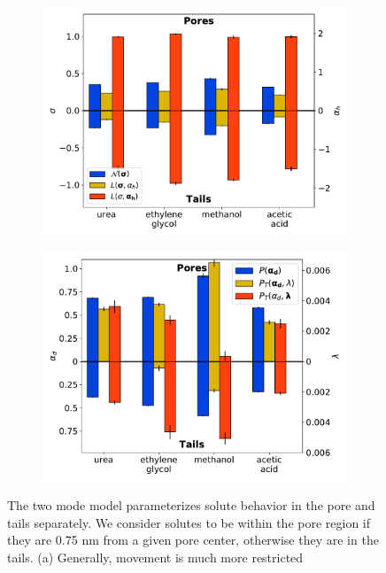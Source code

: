 \documentclass{article}
\begin{document}
  \begin{figure}
  \centering
  \begin{subfigure}{0.475\textwidth}
  \includegraphics[width=\textwidth]{2mode_AD_hops.pdf}
  \caption{}\label{fig:2mode_AD_hops}
  \end{subfigure}
  \begin{subfigure}{0.475\textwidth}
  \includegraphics[width=\textwidth]{2mode_AD_dwells.pdf}
  \caption{}\label{fig:2mode_AD_dwells}
  \end{subfigure}
  \caption{
  The two mode model parameterizes solute behavior in the pore and tails separately.
  We consider solutes to be within the pore region if they are 0.75 nm from a given pore
  center, otherwise they are in the tails. (a) Generally, movement is much more restricted
}
\end{figure}
\end{document}
